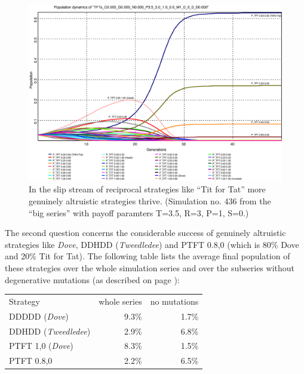 \begin{figure}
\begin{center}
\includegraphics[width=20cm]{images/slipstream_refined.eps} %
\caption{\label{slipstream} In the slip stream of reciprocal
  strategies like ``Tit for Tat'' more genuinely altruistic strategies
  thrive. (Simulation no. 436 from the ``big series'' with payoff paramters
T=3.5, R=3, P=1, S=0.)}
\end{center}
\end{figure}

The second question concerns the considerable success of genuinely altruistic
strategies like {\em Dove}, DDHDD ({\em Tweedledee}) and PTFT 0.8,0 (which is
80\% Dove and 20\% Tit for Tat). The following table lists the average final
population of these strategies over the whole simulation series and over the
subseries without degenerative mutations (as described on page
\pageref{mutationRate}):

\begin{center}
\begin{tabular}{lrr}
Strategy & whole series & no mutations \\[1.5ex]

DDDDD ({\em Dove})       & 9.3\%  &   1.7\% \\
DDHDD ({\em Tweedledee}) & 2.9\%  &   6.8\% \\[1.5ex]

PTFT 1,0 ({\em Dove})    & 8.3\%  &   1.5\% \\
PTFT 0.8,0               & 2.2\%  &   6.5\% \\
\end{tabular}
\end{center}

